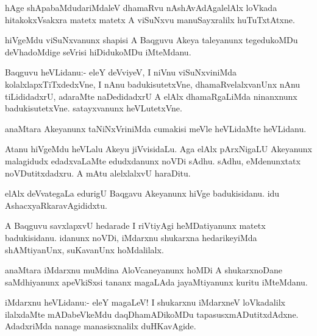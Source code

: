 \documentclass{article}
\begin{document}
\begin{mn}%
hAge shApabaMdudariMdaleV dhamaRvu nAshAvAdAgalelAlx loVkada
hitakokxVsakxra matetx matetx A viSuNxvu manuSayxralilx huTuTxtAtxne.
\end{mn}

\begin{mn}%
hiVgeMdu viSuNxvanunx shapisi A Baqguvu Akeya taleyanunx tegedukoMDu
deVhadoMdige seVrisi hiDidukoMDu iMteMdanu.                                         
\end{mn}

\begin{mn}%
Baqguvu heVLidanu:- eleY deVviyeV, I niVnu viSuNxviniMda
kolalxlapxTiTxdedxVne, I nAnu badukisutetxVne, dhamaRvelalxvanUnx nAnu
tiLididadxrU, adaraMte naDedidadxrU A elAlx dhamaRgaLiMda ninanxnunx
badukisutetxVne. satayxvanunx heVLutetxVne.
\end{mn}

\begin{mn}
anaMtara Akeyanunx taNiNxVriniMda cumakisi meVle heVLidaMte heVLidanu.
\end{mn}

\begin{mn}
Atanu hiVgeMdu heVLalu Akeyu jiVvisidaLu. Aga elAlx pArxNigaLU
Akeyanunx malagidudx edadxvaLaMte edudxdanunx noVDi sAdhu. sAdhu,
eMdenunxtatx noVDutitxdadxru. A mAtu alelxlalxvU haraDitu.
\end{mn}

\begin{mn}
elAlx deVvategaLa edurigU Baqgavu Akeyanunx hiVge badukisidanu. idu AshacxyaRkaravAgididxtu.
\end{mn}

\begin{mn}%
A Baqguvu savxlapxvU hedarade I riVtiyAgi heMDatiyanunx matetx
badukisidanu. idanunx noVDi, iMdarxnu shukarxna hedarikeyiMda
shAMtiyanUnx, suKavanUnx hoMdalilalx.
\end{mn}

\begin{mn}
anaMtara iMdarxnu muMdina AloVcaneyanunx hoMDi A shukarxnoDane
saMdhiyanunx apeVkiSxsi tananx magaLAda jayaMtiyanunx kuritu iMteMdanu.
\end{mn}

\begin{mn}
iMdarxnu heVLidanu:- eleY magaLeV! I shukarxnu iMdarxneV loVkadalilx
ilalxdaMte mADabeVkeMdu daqDhamADikoMDu
tapasusxmADutitxdAdxne. AdadxriMda nanage manasisxnalilx duHKavAgide.
\end{mn}
\end{document}
